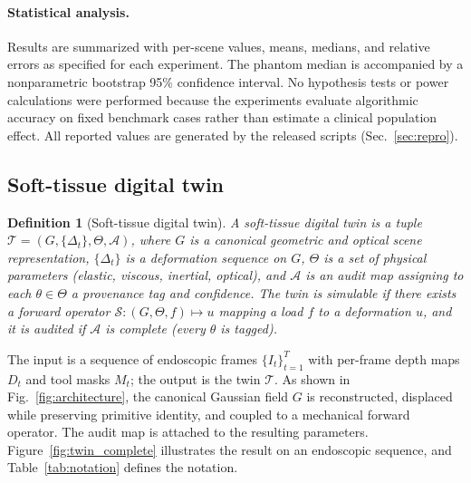 \documentclass[pdflatex,lineno,referee,sn-vancouver,Numbered]{sn-jnl}
\newtheorem{definition}{Definition}
\begin{document}
\paragraph{Statistical analysis.}
Results are summarized with per-scene values, means, medians, and relative
errors as specified for each experiment. The phantom median is accompanied
by a nonparametric bootstrap 95\% confidence interval. No hypothesis tests
or power calculations were performed because the experiments evaluate
algorithmic accuracy on fixed benchmark cases rather than estimate a
clinical population effect. All reported values are generated by the
released scripts (Sec.~\ref{sec:repro}).

\subsection{Soft-tissue digital twin}
\label{sec:twin}
\begin{definition}[Soft-tissue digital twin]
\label{def:twin}
A soft-tissue digital twin is a tuple
$\mathcal{T} = (G, \{\Delta_t\}, \Theta, \mathcal{A})$, where $G$ is a
canonical geometric and optical scene representation, $\{\Delta_t\}$ is a
deformation sequence on $G$, $\Theta$ is a set of physical parameters
(elastic, viscous, inertial, optical), and $\mathcal{A}$ is an audit map
assigning to each $\theta \in \Theta$ a provenance tag and confidence. The
twin is \emph{simulable} if there exists a forward operator
$\mathcal{S} : (G, \Theta, f) \mapsto u$ mapping a load $f$ to a
deformation $u$, and it is \emph{audited} if $\mathcal{A}$ is complete
(every $\theta$ is tagged).
\end{definition}

The input is a sequence of endoscopic frames
$\{I_t\}_{t=1}^{T}$ with per-frame depth maps $D_t$ and tool masks $M_t$;
the output is the twin $\mathcal{T}$. As shown in
Fig.~\ref{fig:architecture}, the canonical Gaussian field $G$ is
reconstructed, displaced while preserving primitive identity, and coupled
to a mechanical forward operator. The audit map is attached to the
resulting parameters. Figure~\ref{fig:twin_complete} illustrates the
result on an endoscopic sequence, and Table~\ref{tab:notation} defines the
notation.
\end{document}

